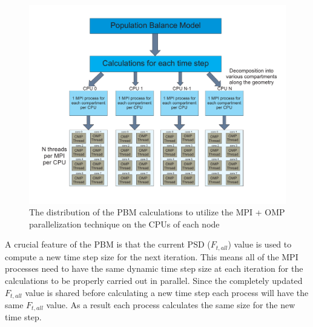 \documentclass[preprint,11pt,authoryear]{elsarticle}
\begin{document}
\begin{figure}
\centering
\includegraphics[scale=0.45]{PBM_decomposition.pdf}
\caption{The distribution of the PBM calculations to utilize the MPI + OMP parallelization technique on the CPUs of each node}
\label{fig:mthds_PBM_decompostion}
\end{figure}

A crucial feature of the PBM is that the current PSD ($F_{t,all}$) value is used to compute a new 
time step size for the next iteration. This means all of the MPI processes need to have the same 
dynamic time step size at each iteration for the calculations to be properly carried out in parallel. Since 
the completely updated $F_{t,all}$ value is shared before calculating a new time step each process will 
have the same $F_{t,all}$ value. As a result each process calculates the same size for the new time 
step. 

\end{document}
